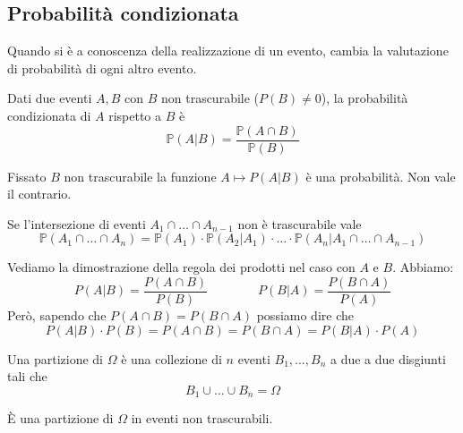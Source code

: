 \subsection{Probabilità condizionata}
Quando si è a conoscenza della realizzazione di un evento, cambia la valutazione di probabilità di ogni altro evento.
\begin{definition}
	Dati due eventi $A, B$ con $B$ non trascurabile ($P(B) \neq 0$), la probabilità condizionata di $A$ rispetto a $B$ è
	\begin{equation}
		\mathbb{P}(A \vert B) = \frac{\mathbb{P}(A \cap B)}{\mathbb{P}(B)}
	\end{equation}
\end{definition}

\begin{observation}
	Fissato $B$ non trascurabile la funzione $A \mapsto P(A\vert B)$ è una probabilità. Non vale il contrario.
\end{observation}

\begin{proposition}
	Se l'intersezione di eventi $A_1 \cap \ldots \cap A_{n-1}$ non è trascurabile vale
	\begin{equation}
		\mathbb{P}(A_1 \cap \ldots \cap A_n) = \mathbb{P} (A_1) \cdot \mathbb{P}(A_2 \vert A_1) \cdot \ldots \cdot \mathbb{P}(A_n \vert A_1 \cap \ldots \cap A_{n-1})
	\end{equation}
\end{proposition}

\begin{demostration}
	Vediamo la dimostrazione della regola dei prodotti nel caso con $A$ e $B$. Abbiamo:
	\begin{equation*}
		P(A\vert B)=\frac{P(A \cap B)}{P(B)} \qquad \qquad P(B\vert A)=\frac{P(B\cap A)}{P(A)}
	\end{equation*}
	Però, sapendo che $P(A\cap B) = P(B \cap A) $ possiamo dire che
	\begin{equation*}
		P(A \vert B) \cdot P(B) = P(A\cap B) = P(B\cap A) = P(B \vert A) \cdot P(A)
	\end{equation*}
\end{demostration}

\begin{definition}[Partizione]
	Una partizione di $\Omega$ è una collezione di $n$ eventi $B_1, \ldots, B_n$ a due a due disgiunti tali che
	\begin{equation}
		B_1 \cup \ldots \cup B_n = \Omega
	\end{equation}
\end{definition}
\begin{definition}
	È una partizione di $\Omega$ in eventi non trascurabili.
\end{definition}

